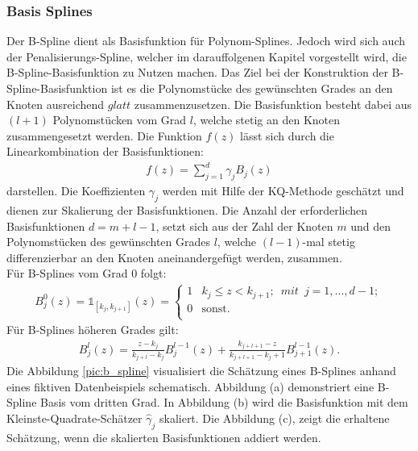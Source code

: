 \subsubsection{Basis Splines}
Der B-Spline dient als Basisfunktion für Polynom-Splines. Jedoch wird sich auch der Penalisierungs-Spline, welcher im darauffolgenen Kapitel vorgestellt wird, die B-Spline-Basisfunktion zu Nutzen machen. Das Ziel bei der Konstruktion der B-Spline-Basisfunktion ist es die Polynomstücke des gewünschten Grades an den Knoten ausreichend $glatt$ zusammenzusetzen. Die Basisfunktion besteht dabei aus $(l+1)$ Polynomstücken vom Grad $l$, welche stetig an den Knoten zusammengesetzt werden. Die Funktion $f(z)$ lässt sich durch die Linearkombination der Basisfunktionen:
\begin{align}
f(z)=\sum_{j=1}^d\gamma_{j}B_{j}(z)
\end{align}
darstellen. Die Koeffizienten  $\gamma_{j}$ werden mit Hilfe der KQ-Methode geschätzt und dienen zur Skalierung der Basisfunktionen. Die Anzahl der erforderlichen Basisfunktionen $d = m+l-1$, setzt sich aus der Zahl der Knoten $m$ und den Polynomstücken des gewünschten Grades $l$, welche $(l-1)$-mal stetig differenzierbar an den Knoten aneinandergefügt werden, zusammen.  \\
Für B-Splines vom Grad 0 folgt:
\begin{align}
B_{j}^0(z)= \mathbb{1}_{[k_{j},k_{j+1}]}(z)= 
\begin{cases}
1 & k_{j} \leq z<k_{j+1};\enspace mit\enspace j=1,...,d-1; \\
0 & \text{sonst.} \\
\end{cases}
\end{align}
Für B-Splines höheren Grades gilt:
\begin{align}
B_{j}^l(z)= \frac{z-k_{j}}{k_{j+l}-k_{j}}B_{j}^{l-1}(z)+
\frac{k_{j+l+1}-z}{k_{j+l+1}-k_j+1}B_{j+1}^{l-1}(z).
\end{align}
Die Abbildung \ref{pic:b_spline} visualisiert die Schätzung eines B-Splines anhand eines fiktiven Datenbeispiels schematisch. Abbildung (a) demonstriert eine B-Spline Basis vom dritten Grad. In Abbildung (b) wird die Basisfunktion mit dem Kleinste-Quadrate-Schätzer $\hat\gamma_{j}$ skaliert. Die Abbildung (c), zeigt die erhaltene Schätzung, wenn die skalierten Basisfunktionen addiert werden.

